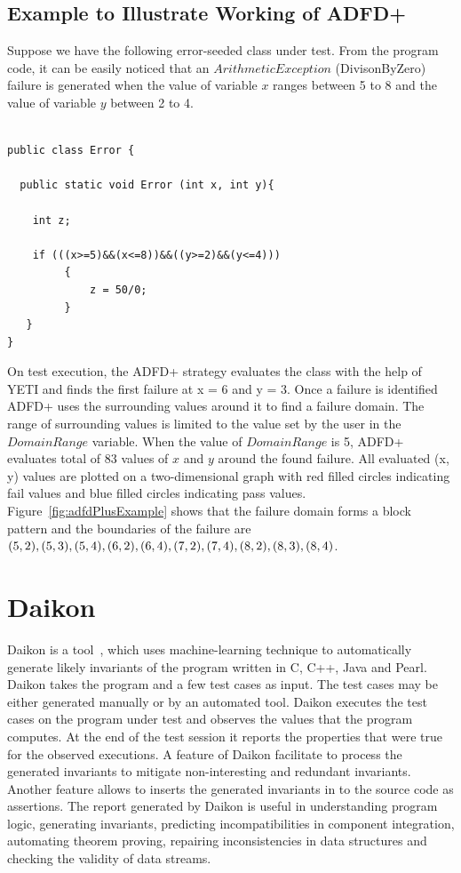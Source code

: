 \subsection{Example to Illustrate Working of ADFD+}\label{sec:intro6_5}
Suppose we have the following error-seeded class under test. From the program code, it can be easily noticed that an $ArithmeticException$ (DivisonByZero) failure is generated when the value of variable $x$ ranges between 5 to 8 and the value of variable $y$ between 2 to 4.

\begin{lstlisting}

public class Error {

  public static void Error (int x, int y){

    int z;

    if (((x>=5)&&(x<=8))&&((y>=2)&&(y<=4)))
		 {
			 z = 50/0;
		 }
   } 
}
\end{lstlisting}

On test execution, the ADFD+ strategy evaluates the class with the help of YETI and finds the first failure at x = 6 and y = 3. Once a failure is identified ADFD+ uses the surrounding values around it to find a failure domain. The range of surrounding values is limited to the value set by the user in the $Domain Range$ variable. When the value of $Domain Range$ is 5, ADFD+ evaluates total of 83 values of $x$ and $y$ around the found failure. All evaluated (x, y) values are plotted on a two-dimensional graph with red filled circles indicating fail values and blue filled circles indicating pass values. Figure~\ref{fig:adfdPlusExample} shows that the failure domain forms a block pattern and the boundaries of the failure are $(5, 2), (5, 3),(5, 4), (6, 2), (6, 4), (7, 2), (7, 4),\\ (8, 2), (8, 3), (8, 4)$. 






\section{Daikon}\label{sec:intro6_6}
Daikon is a tool~\cite{ernst2007daikon}, which uses machine-learning technique to automatically generate likely invariants of the program written in C, C++, Java and Pearl. Daikon takes the program and a few test cases as input. The test cases may be either generated manually or by an automated tool. Daikon executes the test cases on the program under test and observes the values that the program computes. At the end of the test session it reports the properties that were true for the observed executions. A feature of Daikon facilitate to process the generated invariants to mitigate non-interesting and redundant invariants. Another feature allows to inserts the generated invariants in to the source code as assertions. The report generated by Daikon is useful in understanding program logic, generating invariants, predicting incompatibilities in component integration, automating theorem proving, repairing inconsistencies in data structures and checking the validity of data streams.




